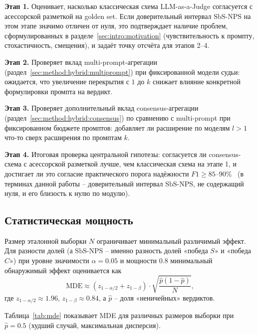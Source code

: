 \textbf{Этап 1.}
Оценивает, насколько классическая схема LLM-as-a-Judge согласуется с
асессорской разметкой на golden set.
Если доверительный интервал $\mathrm{SbS\text{-}NPS}$ на этом этапе
значимо отличен от нуля, это подтверждает наличие проблем,
сформулированных в разделе~\ref{sec:intro:motivation} (чувствительность
к промпту, стохастичность, смещения), и задаёт точку отсчёта для
этапов 2--4.

\textbf{Этап 2.}
Проверяет вклад multi-prompt-агрегации
(раздел~\ref{sec:method:hybrid:multiprompt}) при фиксированной модели
судьи: ожидается, что увеличение перекрытия с $1$ до $k$ снижает
влияние конкретной формулировки промпта на вердикт.

\textbf{Этап 3.}
Проверяет дополнительный вклад consensus-агрегации
(раздел~\ref{sec:method:hybrid:consensus}) по сравнению с multi-prompt
при фиксированном бюджете промптов: добавляет ли расширение по моделям
$l > 1$ что-то сверх расширения по промптам $k$.

\textbf{Этап 4.}
Итоговая проверка центральной гипотезы: согласуется ли consensus-схема с
асессорской разметкой лучше, чем классическая схема на этапе 1, и
достигает ли это согласие практического порога надёжности $F1 \ge
85$--$90\%$~\cite{wang2023pandalm} (в терминах данной работы --
доверительный интервал $\mathrm{SbS\text{-}NPS}$, не содержащий нуля, и
его близость к нулю по модулю).

\subsection{Статистическая мощность}
\label{sec:experiments:power}

Размер эталонной выборки $N$ ограничивает минимальный различимый эффект.
Для разности долей (а $\mathrm{SbS\text{-}NPS}$ -- именно разность долей
«победа $S$» и «победа $C$») при уровне значимости $\alpha = 0.05$ и
мощности $0.8$ минимальный обнаружимый эффект оценивается как
\begin{equation}
    \label{eq:mde}
    \mathrm{MDE} \approx
        (z_{1-\alpha/2} + z_{1-\beta}) \cdot
        \sqrt{\frac{\hat{p}(1 - \hat{p})}{N}},
\end{equation}
где $z_{1-\alpha/2} \approx 1.96$, $z_{1-\beta} \approx 0.84$, а
$\hat{p}$ -- доля «неничейных» вердиктов.

Таблица~\ref{tab:mde} показывает MDE для различных размеров выборки
при $\hat{p} = 0.5$ (худший случай, максимальная дисперсия).

